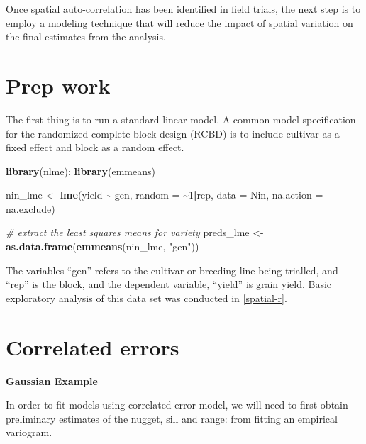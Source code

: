 \documentclass[
]{book}
\newenvironment{Shaded}{\begin{snugshade}}{\end{snugshade}}
\newcommand{\AttributeTok}[1]{\textcolor[rgb]{0.13,0.29,0.53}{#1}}
\newcommand{\CommentTok}[1]{\textcolor[rgb]{0.56,0.35,0.01}{\textit{#1}}}
\newcommand{\DecValTok}[1]{\textcolor[rgb]{0.00,0.00,0.81}{#1}}
\newcommand{\FunctionTok}[1]{\textcolor[rgb]{0.13,0.29,0.53}{\textbf{#1}}}
\newcommand{\NormalTok}[1]{#1}
\newcommand{\OtherTok}[1]{\textcolor[rgb]{0.56,0.35,0.01}{#1}}
\newcommand{\SpecialCharTok}[1]{\textcolor[rgb]{0.81,0.36,0.00}{\textbf{#1}}}
\newcommand{\StringTok}[1]{\textcolor[rgb]{0.31,0.60,0.02}{#1}}
\begin{document}
Once spatial auto-correlation has been identified in field trials, the next step is to employ a modeling technique that will reduce the impact of spatial variation on the final estimates from the analysis.

\hypertarget{prep-work}{%
\section{Prep work}\label{prep-work}}

The first thing is to run a standard linear model. A common model specification for the randomized complete block design (RCBD) is to include cultivar as a fixed effect and block as a random effect.

\begin{Shaded}
\begin{Highlighting}[]
\FunctionTok{library}\NormalTok{(nlme); }\FunctionTok{library}\NormalTok{(emmeans)}

\NormalTok{nin\_lme }\OtherTok{\textless{}{-}} \FunctionTok{lme}\NormalTok{(yield }\SpecialCharTok{\textasciitilde{}}\NormalTok{ gen, }\AttributeTok{random =} \SpecialCharTok{\textasciitilde{}}\DecValTok{1}\SpecialCharTok{|}\NormalTok{rep,}
              \AttributeTok{data =}\NormalTok{ Nin,}
              \AttributeTok{na.action =}\NormalTok{ na.exclude)}

\CommentTok{\# extract the least squares means for variety}
\NormalTok{preds\_lme }\OtherTok{\textless{}{-}} \FunctionTok{as.data.frame}\NormalTok{(}\FunctionTok{emmeans}\NormalTok{(nin\_lme, }\StringTok{"gen"}\NormalTok{))}
\end{Highlighting}
\end{Shaded}

The variables ``gen'' refers to the cultivar or breeding line being trialled, and ``rep'' is the block, and the dependent variable, ``yield'' is grain yield. Basic exploratory analysis of this data set was conducted in \ref{spatial-r}.

\hypertarget{correlated-errors}{%
\section{Correlated errors}\label{correlated-errors}}

\textbf{Gaussian Example}

In order to fit models using correlated error model, we will need to first obtain preliminary estimates of the nugget, sill and range: from fitting an empirical variogram.
\end{document}
